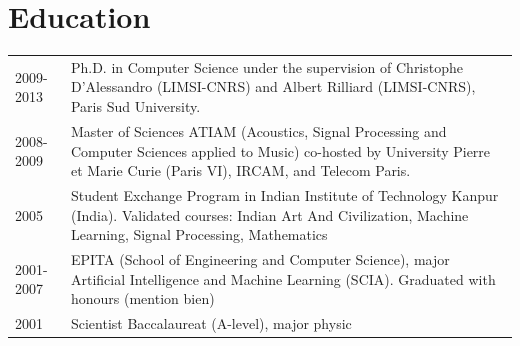 \documentclass[a4paper,12pt]{article}
\begin{document}


\section{Education}
\begin{tabularx}{\linewidth}{@{}l X@{}}	
2009-2013 & Ph.D. in Computer Science under the supervision of Christophe D’Alessandro (LIMSI-CNRS) and Albert Rilliard (LIMSI-CNRS), Paris Sud University.\\
2008-2009 & Master of Sciences ATIAM (Acoustics, Signal Processing and Computer Sciences applied to Music) co-hosted by University Pierre et Marie Curie (Paris VI), IRCAM, and Telecom Paris.\\
2005 & Student Exchange Program in Indian Institute of Technology Kanpur (India). Validated courses: Indian Art And Civilization, Machine Learning, Signal Processing, Mathematics\\
2001-2007 & EPITA (School of Engineering and Computer Science), major Artificial Intelligence and Machine Learning (SCIA). Graduated with honours (mention bien)\\
2001 & Scientist Baccalaureat (A-level), major physic\\
\end{tabularx}
\end{document}
